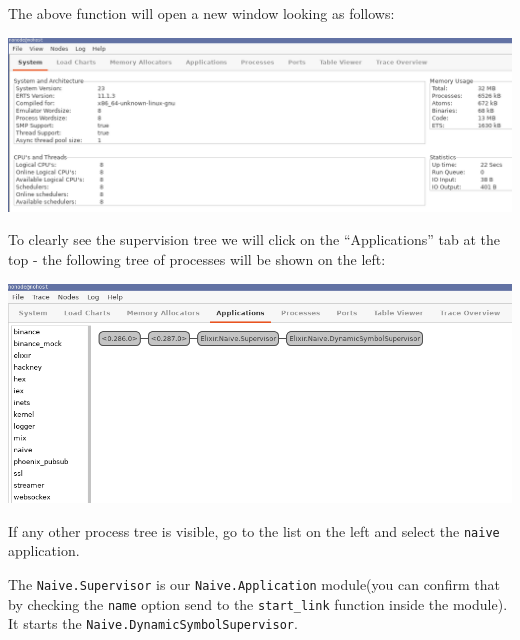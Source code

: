 \documentclass[
  oneside]{book}
\newenvironment{Shaded}{\begin{snugshade}}{\end{snugshade}}
\newcommand{\AttributeTok}[1]{\textcolor[rgb]{0.13,0.29,0.53}{#1}}
\newcommand{\ErrorTok}[1]{\textcolor[rgb]{0.64,0.00,0.00}{\textbf{#1}}}
\newcommand{\ExtensionTok}[1]{#1}
\newcommand{\KeywordTok}[1]{\textcolor[rgb]{0.13,0.29,0.53}{\textbf{#1}}}
\newcommand{\NormalTok}[1]{#1}
\newcommand{\OperatorTok}[1]{\textcolor[rgb]{0.81,0.36,0.00}{\textbf{#1}}}
\begin{document}
\begin{Shaded}
\end{Shaded}

\newpage

The above function will open a new window looking as follows:

\begin{center}\includegraphics[width=1\linewidth]{images/chapter_05_06_new_observer} \end{center}

To clearly see the supervision tree we will click on the ``Applications'' tab at the top - the following tree of processes will be shown on the left:

\begin{center}\includegraphics[width=1\linewidth]{images/chapter_05_07_observer_app_list} \end{center}

If any other process tree is visible, go to the list on the left and select the \texttt{naive} application.

The \texttt{Naive.Supervisor} is our \texttt{Naive.Application} module(you can confirm that by checking the \texttt{name} option send to the \texttt{start\_link} function inside the module). It starts the \texttt{Naive.DynamicSymbolSupervisor}.
\end{document}
